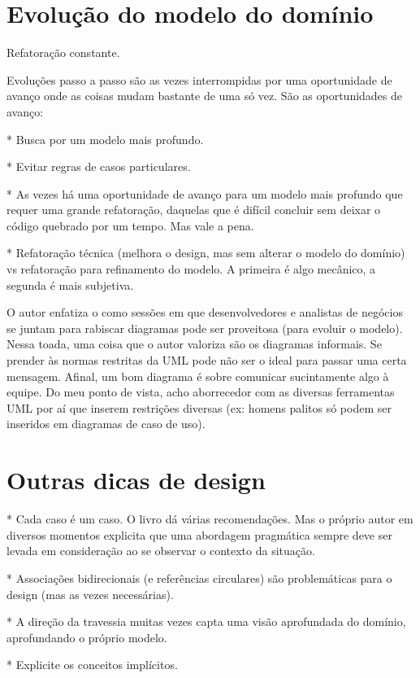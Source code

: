 \documentclass[a4paper, 12pt]{article}
\begin{document}
\section{Evolução do modelo do domínio}


Refatoração constante.

Evoluções passo a passo são as vezes interrompidas por uma oportunidade de avanço onde as coisas mudam bastante de uma só vez. São as oportunidades de avanço: 

* Busca por um modelo mais profundo.

* Evitar regras de casos particulares.

* As vezes há uma oportunidade de avanço para um modelo mais profundo que requer uma grande refatoração, daquelas que é difícil concluir sem deixar o código quebrado por um tempo. Mas vale a pena.

* Refatoração técnica (melhora o design, mas sem alterar o modelo do domínio) vs refatoração para refinamento do modelo. A primeira é algo mecânico, a segunda é mais subjetiva.

O autor enfatiza o como sessões em que desenvolvedores e analistas de negócios se juntam para rabiscar diagramas pode ser proveitosa (para evoluir o modelo). Nessa toada, uma coisa que o autor valoriza são os diagramas informais. Se prender às normas restritas da UML pode não ser o ideal para passar uma certa mensagem. Afinal, um bom diagrama é sobre comunicar sucintamente algo à equipe. Do meu ponto de vista, acho aborrecedor com as diversas ferramentas UML por aí que inserem restrições diversas (ex: homens palitos só podem ser inseridos em diagramas de caso de uso).

\section{Outras dicas de design}

* Cada caso é um caso. O livro dá várias recomendações. Mas o próprio autor em diversos momentos explicita que uma abordagem pragmática sempre deve ser levada em consideração ao se observar o contexto da situação.

* Associações bidirecionais (e referências circulares) são problemáticas para o design (mas as vezes necessárias).

* A direção da travessia muitas vezes capta uma visão aprofundada do domínio, aprofundando o próprio modelo. 

* Explicite os conceitos implícitos.
\end{document}
